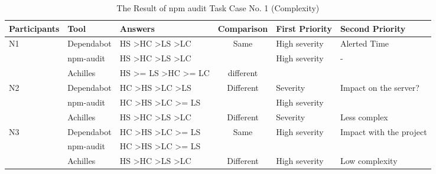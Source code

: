 \documentclass[conference]{IEEEtran}
\begin{document}
		\begin{table}[tb]
		\centering
		\caption{The Result of npm audit Task Case No. 1 (Complexity)}
		\begin{tabular}{|l|l|l|c|l|l|}
			\hline
			Participants         & Tool       & Answers                                                     & \multicolumn{1}{l|}{Comparison} & First Priority                    & Second Priority            \\ \hline
			\multirow{3}{*}{N1}  & Dependabot & HS \textgreater HC \textgreater LS \textgreater LC          & \multirow{2}{*}{Same}           & High severity                     & Alerted Time               \\ \cline{2-3} \cline{5-6} 
			& npm-audit  & HS \textgreater HC \textgreater LS \textgreater LC          &                                 & High severity                     & -                          \\ \cline{2-6} 
			& Achilles   & HS \textgreater{}= LS \textgreater HC \textgreater{}= LC    & different                       &                                   &                            \\ \hline
			\multirow{3}{*}{N2}  & Dependabot & HC \textgreater HS \textgreater LC \textgreater LS          & \multirow{2}{*}{Different}      & Severity                          & Impact on the server?      \\ \cline{2-3} \cline{5-6} 
			& npm-audit  & HC \textgreater HS \textgreater LC \textgreater{}= LS       &                                 & High severity                     &                            \\ \cline{2-6} 
			& Achilles   & HS \textgreater HC \textgreater LS \textgreater LC          & Different                       & Severity                          & Less complex               \\ \hline
			\multirow{3}{*}{N3}  & Dependabot & HC \textgreater HS \textgreater LC \textgreater{}= LS       & \multirow{2}{*}{Same}           & High severity                     & Impact with the project    \\ \cline{2-3} \cline{5-6} 
			& npm-audit  & HC \textgreater HS \textgreater LC \textgreater{}= LS       &                                 &                                   &                            \\ \cline{2-6} 
			& Achilles   & HS \textgreater HC \textgreater LS \textgreater LC          & Different                       & High severity                     & Low complexity             \\ \hline

\end{tabular}
\end{table}
\end{document}
